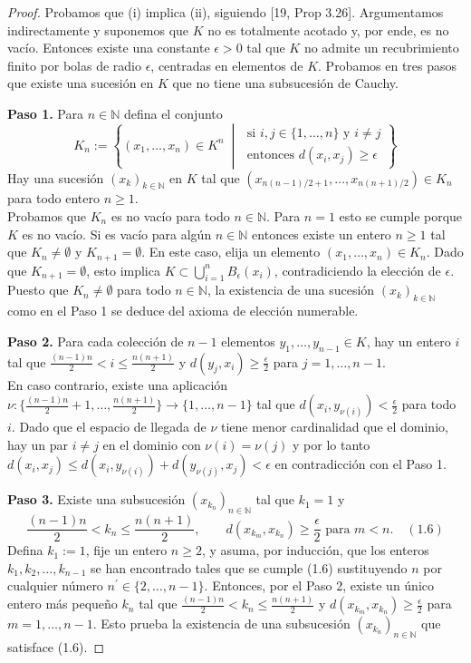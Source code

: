 \begin{proof}
Probamos que (i) implica (ii), siguiendo [19, Prop 3.26]. Argumentamos indirectamente y suponemos que $K$ no es totalmente acotado y, por ende, es no vacío. Entonces existe una constante $\epsilon>0$ tal que $K$ no admite un recubrimiento finito por bolas de radio $\epsilon$, centradas en elementos de $K$. Probamos en tres pasos que existe una sucesión en $K$ que no tiene una subsucesión de Cauchy.

\noindent \textbf{Paso 1.} Para $n\in\mathbb{N}$ defina el conjunto
\[ K_{n} := \left\{(x_{1},\dots,x_{n})\in K^{n} \;\middle|\; \begin{array}{l} \text{si } i,j\in\{1,\dots,n\} \text{ y } i\ne j \\ \text{entonces } d(x_{i},x_{j})\ge\epsilon \end{array} \right\} \]
Hay una sucesión $(x_{k})_{k\in\mathbb{N}}$ en $K$ tal que $(x_{n(n-1)/2+1},\dots,x_{n(n+1)/2})\in K_{n}$ para todo entero $n\ge 1$.
\\ Probamos que $K_{n}$ es no vacío para todo $n\in\mathbb{N}$. Para $n=1$ esto se cumple porque $K$ es no vacío. Si es vacío para algún $n\in\mathbb{N}$ entonces existe un entero $n\ge 1$ tal que $K_{n}\ne\emptyset$ y $K_{n+1}=\emptyset$. En este caso, elija un elemento $(x_{1},\dots,x_{n})\in K_{n}$. Dado que $K_{n+1}=\emptyset$, esto implica $K\subset\bigcup_{i=1}^{n}B_{\epsilon}(x_{i})$, contradiciendo la elección de $\epsilon$. Puesto que $K_{n}\ne\emptyset$ para todo $n\in\mathbb{N}$, la existencia de una sucesión $(x_{k})_{k\in\mathbb{N}}$ como en el Paso 1 se deduce del axioma de elección numerable.

\noindent \textbf{Paso 2.} Para cada colección de $n-1$ elementos $y_{1},\dots,y_{n-1}\in K$, hay un entero $i$ tal que $\frac{(n-1)n}{2}<i\le\frac{n(n+1)}{2}$ y $d(y_{j},x_{i})\ge\frac{\epsilon}{2}$ para $j=1,\dots,n-1$.
\\ En caso contrario, existe una aplicación $\nu:\{\frac{(n-1)n}{2}+1,\dots,\frac{n(n+1)}{2}\}\rightarrow\{1,\dots,n-1\}$ tal que $d(x_{i},y_{\nu(i)})<\frac{\epsilon}{2}$ para todo $i$. Dado que el espacio de llegada de $\nu$ tiene menor cardinalidad que el dominio, hay un par $i\ne j$ en el dominio con $\nu(i)=\nu(j)$ y por lo tanto $d(x_{i},x_{j})\le d(x_{i},y_{\nu(i)})+d(y_{\nu(j)},x_{j})<\epsilon$ en contradicción con el Paso 1.

\noindent \textbf{Paso 3.} Existe una subsucesión $(x_{k_{n}})_{n\in\mathbb{N}}$ tal que $k_{1}=1$ y
\[ \frac{(n-1)n}{2}<k_{n}\le\frac{n(n+1)}{2}, \qquad d(x_{k_{m}},x_{k_{n}})\ge\frac{\epsilon}{2} \text{ para } m<n. \quad (1.6) \]
Defina $k_{1}:=1$, fije un entero $n\ge 2$, y asuma, por inducción, que los enteros $k_{1},k_{2},\dots,k_{n-1}$ se han encontrado tales que se cumple (1.6) sustituyendo $n$ por cualquier número $n^{\prime}\in\{2,\dots,n-1\}$. Entonces, por el Paso 2, existe un único entero más pequeño $k_{n}$ tal que $\frac{(n-1)n}{2}<k_{n}\le\frac{n(n+1)}{2}$ y $d(x_{k_{m}},x_{k_{n}})\ge\frac{\epsilon}{2}$ para $m=1,\dots,n-1$. Esto prueba la existencia de una subsucesión $(x_{k_{n}})_{n\in\mathbb{N}}$ que satisface (1.6).


\end{proof}
